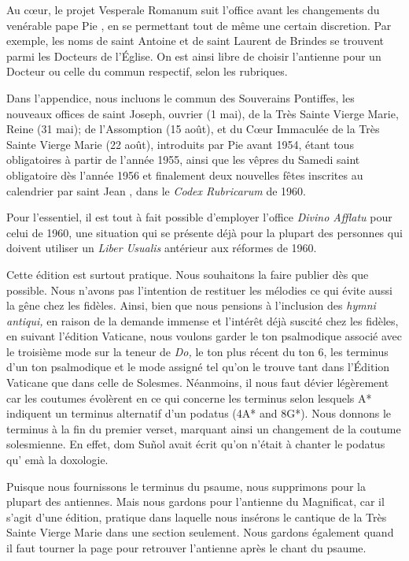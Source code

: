 \begin{frpars}

Au cœur, le projet Vesperale Romanum suit l'office avant les changements du venérable pape Pie , en se permettant tout de même une certain discretion. Par exemple, les noms de saint Antoine et de saint Laurent de Brindes se trouvent parmi les Docteurs de l'Église. On est ainsi libre de choisir l'antienne pour un Docteur ou celle du commun respectif, selon les rubriques.

Dans l'appendice, nous incluons le commun des Souverains Pontiffes, les nouveaux offices de saint Joseph, ouvrier (1 mai), de la Très Sainte Vierge Marie, Reine (31 mai); de l'Assomption (15 août), et du Cœur Immaculée de la Très Sainte Vierge Marie (22 août), introduits par Pie  avant 1954, étant tous obligatoires à partir de l'année 1955, ainsi que les vêpres du Samedi saint obligatoire dès l'année 1956 et finalement deux nouvelles fêtes inscrites au calendrier par saint Jean , dans le \textit{Codex Rubricarum} de 1960.

Pour l'essentiel, il est tout à fait possible d'employer l'office \textit{Divino Afflatu} pour celui de 1960, une situation qui se présente déjà pour la plupart des personnes qui doivent utiliser un \textit{Liber Usualis} antérieur aux réformes de 1960.

Cette édition est surtout pratique. Nous souhaitons la faire publier dès que possible. Nous n'avons pas l'intention de restituer les mélodies ce qui évite aussi la gêne chez les fidèles. Ainsi, bien que nous pensions à l'inclusion des \textit{hymni antiqui,} en raison de la demande immense et l'intérêt déjà suscité chez les fidèles, en suivant l'édition Vaticane, nous voulons garder le ton psalmodique associé avec le troisième mode sur la teneur de \textit{Do,} le ton plus récent du ton 6, les terminus d'un ton psalmodique et le mode assigné tel qu'on le trouve tant dans l'Édition Vaticane que dans celle de Solesmes. Néanmoins, il nous faut dévier légèrement car les coutumes évolèrent en ce qui concerne les terminus selon lesquels A* indiquent un terminus alternatif d'un podatus  (4A* and 8G*). Nous donnons le terminus à la fin du premier verset, marquant ainsi un changement de la coutume solesmienne. En effet, dom Suñol avait écrit qu'on n'était à chanter le podatus qu' emà la doxologie.

Puisque nous fournissons le terminus du psaume, nous supprimons  pour la plupart des antiennes. Mais nous gardons  pour l'antienne du Magnificat, car il s'agit d'une édition, pratique dans laquelle nous insérons le cantique de la Très Sainte Vierge Marie dans une section seulement. Nous gardons également  quand il faut tourner la page pour retrouver l'antienne après le chant du psaume.


\end{frpars}
